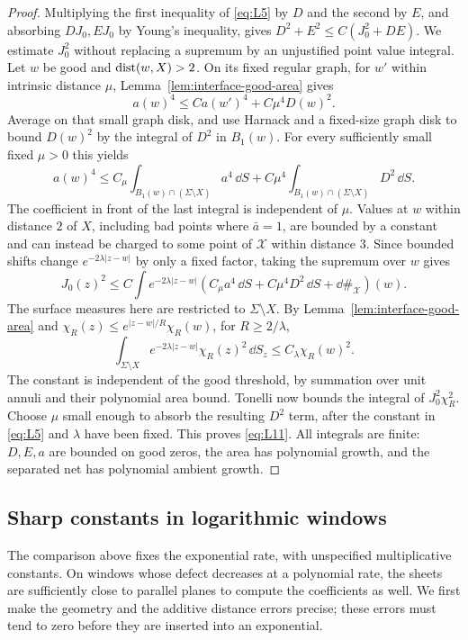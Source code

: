\begin{proof}
Multiplying the first inequality of \eqref{eq:L5} by $D$ and the
second by $E$, and absorbing $DJ_0,EJ_0$ by Young's inequality,
gives $D^2+E^2\le C(J_0^2+DE)$.
We estimate $J_0^2$ without replacing a supremum by an unjustified
point value integral.  Let $w$ be good and $\operatorname{dist}(w,X)>2$.
On its fixed regular graph, for $w'$ within intrinsic distance $\mu$,
Lemma~\ref{lem:interface-good-area} gives
\[
 a(w)^4\le C a(w')^4+C\mu^4D(w)^2.
\]
Average on that small graph disk, and use Harnack and a fixed-size
graph disk to bound $D(w)^2$ by the integral of $D^2$ in $B_1(w)$.
For every sufficiently small fixed $\mu>0$ this yields
\[
 a(w)^4\le C_\mu\int_{B_1(w)\cap(\Sigma\setminus X)}a^4\,\dd S
       +C\mu^4\int_{B_1(w)\cap(\Sigma\setminus X)}D^2\,\dd S.
\]
The coefficient in front of the last integral is independent of
$\mu$.  Values at $w$ within distance $2$ of $X$, including bad
points where $\bar a=1$, are bounded by a constant and can instead
be charged to some point of $\mathcal X$ within distance $3$.
Since bounded shifts change $e^{-2\lambda|z-w|}$ by only a fixed
factor, taking the supremum over $w$ gives
\[
 J_0(z)^2\le C\int e^{-2\lambda|z-w|}
   \left(C_\mu a^4\,\dd S+C\mu^4D^2\,\dd S
                                  +\dd\#_{\mathcal X}\right)(w).
\]
The surface measures here are restricted to $\Sigma\setminus X$.
By Lemma~\ref{lem:interface-good-area} and
$\chi_R(z)\le e^{|z-w|/R}\chi_R(w)$, for $R\ge2/\lambda$,
\[
 \int_{\Sigma\setminus X}
   e^{-2\lambda|z-w|}\chi_R(z)^2\,\dd S_z
       \le C_\lambda\chi_R(w)^2.
\]
The constant is independent of the good threshold, by summation over
unit annuli and their polynomial area bound.  Tonelli now bounds
the integral of $J_0^2\chi_R^2$.  Choose $\mu$ small enough to
absorb the resulting $D^2$ term, after the constant in
\eqref{eq:L5} and $\lambda$ have been fixed.  This proves
\eqref{eq:L11}.  All integrals are finite: $D,E,a$ are bounded on
good zeros, the area has polynomial growth, and the separated net
has polynomial ambient growth.
\end{proof}

\subsection{Sharp constants in logarithmic windows}

The comparison above fixes the exponential rate, with unspecified
multiplicative constants.  On windows whose defect decreases at a
polynomial rate, the sheets are sufficiently close to parallel planes
to compute the coefficients as well.  We first make the geometry and
the additive distance errors precise; these errors must tend to zero
before they are inserted into an exponential.

